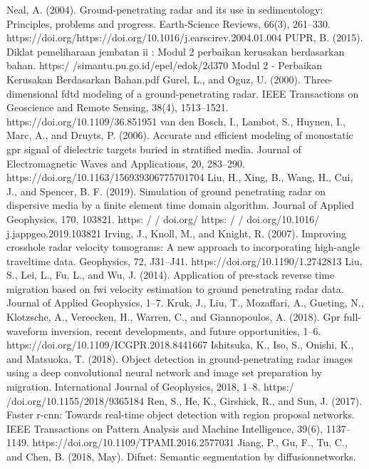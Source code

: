 \documentclass[conference]{IEEEtran}
\begin{document}
\begin{thebibliography}{00}
 Neal, A. (2004). Ground-penetrating radar and its use in sedimentology: Principles, problems and progress. Earth-Science Reviews, 66(3), 261–330. https://doi.org/https://doi.org/10.1016/j.earscirev.2004.01.004
 PUPR, B. (2015). Diklat pemeliharaan jembatan ii : Modul 2 perbaikan kerusakan berdasarkan bahan. https:/ /simantu.pu.go.id/epel/edok/2d370 Modul 2 - Perbaikan Kerusakan Berdasarkan Bahan.pdf
 Gurel, L., and Oguz, U. (2000). Three-dimensional fdtd modeling of a ground-penetrating radar. IEEE Transactions on Geoscience and Remote Sensing, 38(4), 1513–1521. https://doi.org/10.1109/36.851951
 van den Bosch, I., Lambot, S., Huynen, I., Marc, A., and Druyts, P. (2006). Accurate and efficient modeling of monostatic gpr signal of dielectric targets buried in stratified media. Journal of Electromagnetic Waves and Applications, 20, 283–290. https://doi.org/10.1163/156939306775701704
 Liu, H., Xing, B., Wang, H., Cui, J., and Spencer, B. F. (2019). Simulation of ground penetrating radar on dispersive media by a finite element time domain algorithm. Journal of Applied Geophysics, 170, 103821. https: / / doi.org/ https: / / doi.org/10.1016/ j.jappgeo.2019.103821
 Irving, J., Knoll, M., and Knight, R. (2007). Improving crosshole radar velocity tomograms: A new approach to incorporating high-angle traveltime data. Geophysics, 72, J31–J41. https://doi.org/10.1190/1.2742813
 Liu, S., Lei, L., Fu, L., and Wu, J. (2014). Application of pre-stack reverse time migration based on fwi velocity estimation to ground penetrating radar data. Journal of Applied Geophysics, 1–7.
 Kruk, J., Liu, T., Mozaffari, A., Gueting, N., Klotzsche, A., Vereecken, H., Warren, C., and Giannopoulos, A. (2018). Gpr full-waveform inversion, recent developments, and future opportunities, 1–6. https://doi.org/10.1109/ICGPR.2018.8441667
 Ishitsuka, K., Iso, S., Onishi, K., and Matsuoka, T. (2018). Object detection in ground-penetrating radar images using a deep convolutional neural network and image set preparation by migration. International Journal of Geophysics, 2018, 1–8. https:/ /doi.org/10.1155/2018/9365184
 Ren, S., He, K., Girshick, R., and Sun, J. (2017). Faster r-cnn: Towards real-time object detection with region proposal networks. IEEE Transactions on Pattern Analysis and Machine Intelligence, 39(6), 1137–1149. https://doi.org/10.1109/TPAMI.2016.2577031
 Jiang, P., Gu, F., Tu, C., and Chen, B. (2018, May). Difnet: Semantic segmentation by diffusionnetworks.

\end{thebibliography}
\end{document}
